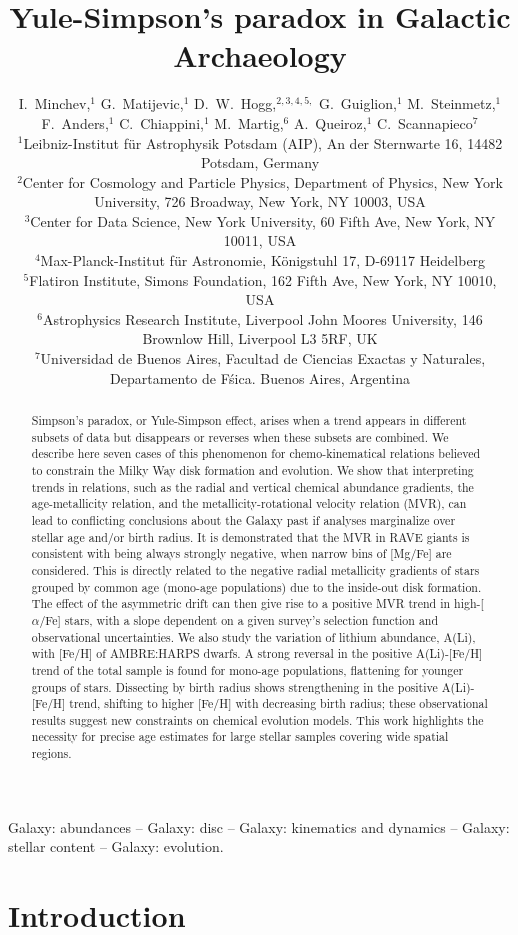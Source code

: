 \documentclass[usenatbib]{mnras}
\title[Yule-Simpson's paradox in Galactic Archaeology]
  {Yule-Simpson's paradox in Galactic Archaeology}
\author[I.~Minchev et al.]
{I.~Minchev,$^{1}$
G.~Matijevic,$^{1}$
D.~W.~Hogg,$^{2,3,4,5,}$
G.~Guiglion,$^{1}$
M.~Steinmetz,$^{1}$
\newauthor
F.~Anders,$^{1}$
C.~Chiappini,$^{1}$
M.~Martig,$^6$
A.~Queiroz,$^{1}$
C.~Scannapieco$^{7}$ 
\\
$^{1}$Leibniz-Institut f\"ur  Astrophysik Potsdam (AIP), An der Sternwarte 16, 14482 Potsdam, Germany\\
$^{2}${Center for Cosmology and Particle Physics, Department of Physics, New York University, 726 Broadway, New York, NY 10003, USA}\\
$^{3}${Center for Data Science, New York University, 60 Fifth Ave, New York, NY 10011, USA}\\
$^{4}${Max-Planck-Institut f\"ur Astronomie, K\"onigstuhl 17, D-69117 Heidelberg}\\
$^{5}${Flatiron Institute, Simons Foundation, 162 Fifth Ave, New York, NY 10010, USA}\\
$^6$Astrophysics Research Institute, Liverpool John Moores University, 146 Brownlow Hill, Liverpool L3 5RF, UK\\
$^7$Universidad de Buenos Aires, Facultad de Ciencias Exactas y Naturales, Departamento de F\'sica. Buenos Aires, Argentina
}
\begin{document}
\label{firstpage}
\pagerange{\pageref{firstpage}--\pageref{lastpage}}
\maketitle


\begin{abstract}


Simpson's paradox, or Yule-Simpson effect, arises when a trend appears in different subsets of data but disappears or reverses when these subsets are combined. We describe here seven cases of this phenomenon for chemo-kinematical relations believed to constrain the Milky Way disk formation and evolution. We show that interpreting trends in relations, such as the radial and vertical chemical abundance gradients, the age-metallicity relation, and the metallicity-rotational velocity relation (MVR), can lead to conflicting conclusions about the Galaxy past if analyses marginalize over stellar age and/or birth radius. It is demonstrated that the MVR in RAVE giants is consistent with being always strongly negative, when narrow bins of [Mg/Fe] are considered. This is directly related to the negative radial metallicity gradients of stars grouped by common age (mono-age populations) due to the inside-out disk formation. The effect of the asymmetric drift can then give rise to a positive MVR trend in high-[$\alpha$/Fe] stars, with a slope dependent on a given survey's selection function and observational uncertainties. We also study the variation of lithium abundance, A(Li), with [Fe/H] of AMBRE:HARPS dwarfs. A strong reversal in the positive A(Li)-[Fe/H] trend of the total sample is found for mono-age populations, flattening for younger groups of stars. Dissecting by birth radius shows strengthening in the positive A(Li)-[Fe/H] trend, shifting to higher [Fe/H] with decreasing birth radius; these observational results suggest new constraints on chemical evolution models.
This work highlights the necessity for precise age estimates for large stellar samples covering wide spatial regions. 
\end{abstract}


\begin{keywords}
Galaxy: abundances -- Galaxy: disc -- Galaxy: kinematics and dynamics -- Galaxy:
stellar content -- Galaxy: evolution.
\end{keywords}


\section{Introduction}
\label{sec:intro}
\end{document}
